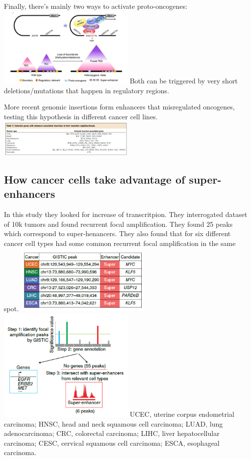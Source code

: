Finally, there's mainly two ways to activate proto-oncogenes:
\includegraphics[width=0.5\textwidth]{../_resources/8bd5f4820c364c35b02c35eb0e48f464.png}
Both can be triggered by very short deletions/mutations that happen in regulatory regions.

More recent genomic insertions form enhancers that misregulated oncogenes, testing this hypothesis in different cancer cell lines.
\includegraphics[width=0.5\textwidth]{../_resources/2d36e2c5659b9cf459872faefbfda869.png}

\hypertarget{how-cancer-cells-take-advantage-of-super-enhancers}{%
\subsection{How cancer cells take advantage of super-enhancers}\label{how-cancer-cells-take-advantage-of-super-enhancers}}

In this study they looked for increase of transcritpion. They interrogated dataset of 10k tumors and found recurrent focal amplification. They found 25 peaks which correspond to super-henancers. They also found that for six different cancer cell types had some common recurrent focal amplification in the same spot.
\includegraphics[width=0.5\textwidth]{../_resources/796c982294bedb0a7994a942aa5ff2a5.png}
\includegraphics[width=0.5\textwidth]{../_resources/85250d5cfb0f02d4fd06f8a7ae09e4a3.png}
UCEC, uterine corpus endometrial carcinoma; HNSC, head and neck squamous cell carcinoma; LUAD, lung adenocarcinoma; CRC, colorectal carcinoma; LIHC, liver hepatocellular carcinoma; CESC, cervical squamous cell carcinoma; ESCA, esophageal carcinoma.

